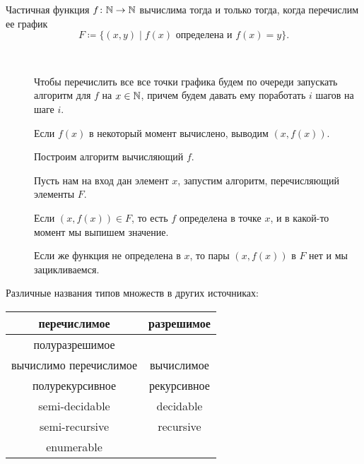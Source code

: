 \begin{thm}[О графике]
    Частичная функция $ f\colon \mathbb{N} \to \mathbb{N}$ вычислима тогда и только тогда, когда перечислим ее график 
	\[
		F \coloneqq  \{(x, y) \mid f(x) \text{ определена и } f(x) = y\}
	.\] 
\end{thm}
\begin{proof*}
    ~ \begin{description}
		\item[] 
	    Чтобы перечислить все все точки графика будем по очереди запускать алгоритм для $ f$ на $ x \in \mathbb{N}$, причем будем давать ему поработать $ i$ шагов на шаге $ i$.
	    
	    Если $ f(x)$ в некоторый момент вычислено, выводим $ (x, f(x))$.
	\item[]
	    Построим алгоритм вычисляющий $ f$. 

		Пусть нам на вход дан элемент $ x$, запустим алгоритм, перечисляющий элементы $ F$. 

		Если $ (x, f(x)) \in F$, то есть $ f$ определена в точке $ x$, и в какой-то момент мы выпишем значение.  

	    Если же функция не определена в $ x$, то пары $ (x, f(x))$ в $ F$ нет и мы зацикливаемся.
    \end{description} 
\end{proof*}


\begin{note}
	Различные названия типов множеств в других источниках:
	\begin{center}
	\begin{tabular}{c|c}
		перечислимое & разрешимое \\
		\hline
		полуразрешимое &   \\
		вычислимо перечислимое & вычислимое \\
		полурекурсивное & рекурсивное \\
		\hline
		semi-decidable & decidable \\
		semi-recursive & recursive \\
		enumerable & 
    \end{tabular}
	\end{center}
\end{note}


